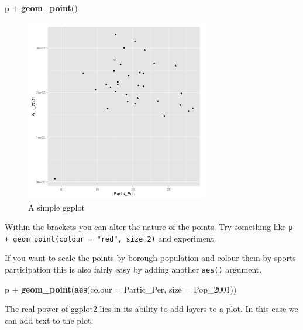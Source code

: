 \documentclass[]{article}
\newenvironment{Shaded}{}{}
\newcommand{\KeywordTok}[1]{\textcolor[rgb]{0.00,0.44,0.13}{\textbf{{#1}}}}
\newcommand{\DataTypeTok}[1]{\textcolor[rgb]{0.56,0.13,0.00}{{#1}}}
\newcommand{\NormalTok}[1]{{#1}}
\let\Oldincludegraphics\includegraphics
\renewcommand{\includegraphics}[1]{\Oldincludegraphics[width=8cm]{#1}}
\begin{document}
\begin{Shaded}
\begin{Highlighting}[]
\NormalTok{p + }\KeywordTok{geom_point}\NormalTok{()}
\end{Highlighting}
\end{Shaded}
\begin{figure}[htbp]
\centering
\includegraphics{figure/A_simple_ggplot.png}
\caption{A simple ggplot}
\end{figure}

Within the brackets you can alter the nature of the points. Try
something like \texttt{p + geom\_point(colour = "red", size=2)} and
experiment.

If you want to scale the points by borough population and colour them by
sports participation this is also fairly easy by adding another
\texttt{aes()} argument.

\begin{Shaded}
\begin{Highlighting}[]
\NormalTok{p + }\KeywordTok{geom_point}\NormalTok{(}\KeywordTok{aes}\NormalTok{(}\DataTypeTok{colour =} \NormalTok{Partic_Per, }\DataTypeTok{size =} \NormalTok{Pop_2001))}
\end{Highlighting}
\end{Shaded}
The real power of ggplot2 lies in its ability to add layers to a plot.
In this case we can add text to the plot.
\end{document}
